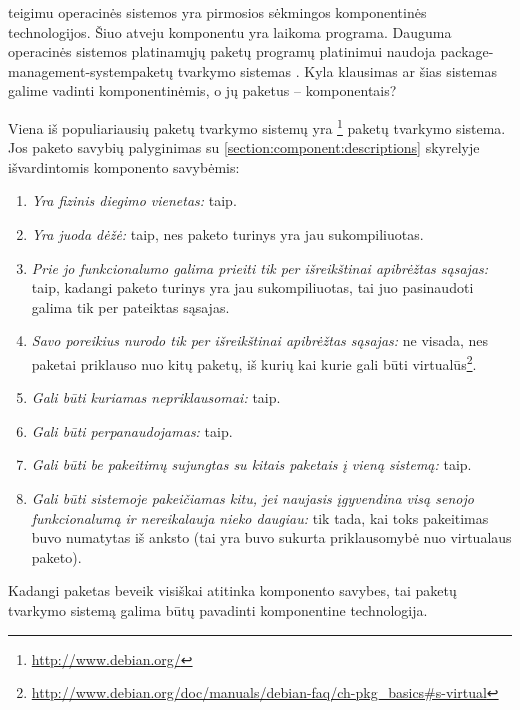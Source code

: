 \cite[12]{cs-beyond-object-oriented-programming} teigimu operacinės
sistemos yra pirmosios sėkmingos komponentinės technologijos. Šiuo
atveju komponentu yra laikoma programa. Dauguma 
operacinės sistemos platinamųjų paketų  programų
platinimui naudoja \gls{package-management-system}{paketų tvarkymo
sistemas} . Kyla klausimas ar šias
sistemas galime vadinti komponentinėmis, o jų paketus –
komponentais?

Viena iš populiariausių paketų tvarkymo sistemų yra
\footnote{\url{http://www.debian.org/}} paketų
tvarkymo sistema. Jos paketo savybių palyginimas su
\ref{section:component:descriptions} skyrelyje išvardintomis
komponento savybėmis:
\begin{enumerate}
  \item \emph{Yra fizinis diegimo vienetas:} taip.
  \item \emph{Yra juoda dėžė:} taip, nes paketo turinys yra jau
    sukompiliuotas.
  \item \emph{Prie jo funkcionalumo galima prieiti tik per
    išreikštinai apibrėžtas sąsajas:} taip, kadangi paketo turinys
    yra jau sukompiliuotas, tai juo pasinaudoti galima tik per
    pateiktas sąsajas.
  \item \emph{Savo poreikius nurodo tik per išreikštinai apibrėžtas
    sąsajas:} ne visada, nes  paketai priklauso nuo
    kitų paketų, iš kurių kai kurie gali būti virtualūs\footnote{
    \url{http://www.debian.org/doc/manuals/debian-faq/ch-pkg_basics\#s-virtual}}.
  \item \emph{Gali būti kuriamas nepriklausomai:} taip.
  \item \emph{Gali būti perpanaudojamas:} taip.
  \item \emph{Gali būti be pakeitimų sujungtas su kitais paketais
    į vieną sistemą:} taip.
  \item \emph{Gali būti sistemoje pakeičiamas kitu, jei naujasis
    įgyvendina visą senojo funkcionalumą ir nereikalauja nieko
    daugiau:} tik tada, kai toks pakeitimas buvo numatytas iš anksto
    (tai yra buvo sukurta priklausomybė nuo virtualaus paketo).
\end{enumerate}
Kadangi  paketas beveik visiškai atitinka komponento
savybes, tai  paketų tvarkymo sistemą galima
būtų pavadinti komponentine technologija.

